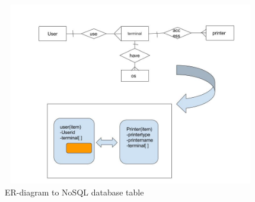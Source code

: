  \begin{figure}[h]
 \includegraphics[width=15cm, height=8cm]{2.jpg}
 \centering
 \caption{\label{fig:1}ER-diagram to NoSQL database table}
 \end{figure}

